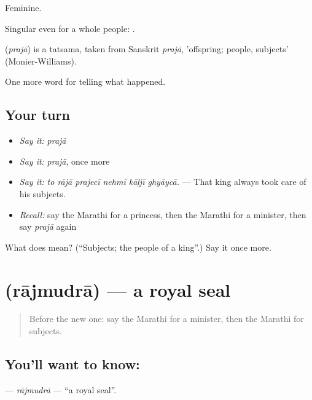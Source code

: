 Feminine.

Singular even for a whole people:   .

\begin{cousinweb}
\textbf{} (\emph{prajā}) is a tatsama, taken from Sanskrit \emph{prajā}, 'offspring; people, subjects' (Monier-Williams).
\end{cousinweb}

\begin{grammarlens}[title={What you've built}]
One more word for telling what happened.
\end{grammarlens}

\subsection*{Your turn}
\begin{itemize}
\raggedright
  \item \emph{Say it:} \emph{prajā}
  \item \emph{Say it:} \emph{prajā}, once more
  \item \emph{Say it:} \emph{to rājā prajecī nehmī kāḷjī ghyāycā.} — That king always took care of his subjects.
  \item \emph{Recall:} say the Marathi for a princess, then the Marathi for a minister, then say \emph{prajā} again
\end{itemize}

\begin{tcolorbox}[breakable,colback=teal!4,colframe=teal!35!black,title={Before you move on}]
What does  mean? (\textquotedblleft{}Subjects; the people of a king\textquotedblright{}.) Say it once more.
\end{tcolorbox}
\section[\texorpdfstring{\mr{राजमुद्रा} (rājmudrā)}{राजमुद्रा (rājmudrā)}]{ (rājmudrā) — a royal seal}

\label{lesson:MR-C327-rajmudra}



\begin{quote}
Before the new one: say the Marathi for a minister, then the Marathi for subjects.
\end{quote}

\subsection*{You'll want to know: }
\textbf{} — \emph{rājmudrā} — \textquotedblleft{}a royal seal\textquotedblright{}.

